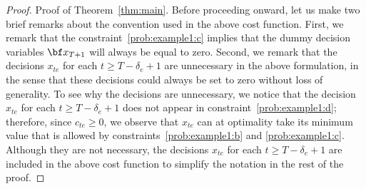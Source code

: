 \documentclass[nonblindrev,mnsc]{informs3} %
\newcommand{\bx}{{\bf x}}
\begin{document}
\begin{APPENDICES}
\begin{proof}{Proof of Theorem~\ref{thm:main}. }
Before proceeding onward, let us make two brief remarks about the convention used in the above cost function. First, we remark that the constraint~\eqref{prob:example1:c} implies that the dummy decision variables $\bx_{T+1}$ will always be equal to zero. Second, we remark that the decisions $x_{te}$ for each $t \ge T-\delta_e + 1$ are unnecessary in the above formulation, in the sense that these decisions  could always be set to zero without loss of generality. To see why the decisions are unnecessary, we notice that the decision  $x_{te}$ for each $t \ge T-\delta_e + 1$ does not appear in constraint~\eqref{prob:example1:d}; therefore, since $c_{te} \ge 0$, we observe that $x_{te}$ can at optimality take its minimum value that is allowed by constraints~\eqref{prob:example1:b} and \eqref{prob:example1:c}.  Although they are not necessary, the decisions  $x_{te}$ for each $t \ge T-\delta_e + 1$ are included in the above cost function to simplify the notation in the rest of the proof. %


\end{proof}
\end{APPENDICES}
\end{document}
